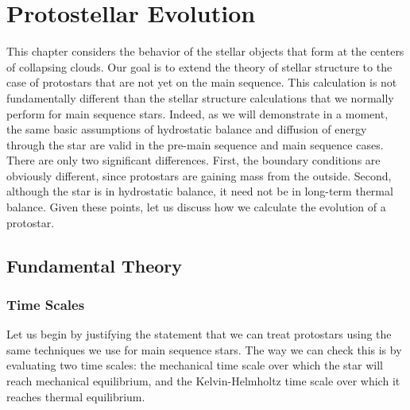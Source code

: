 \chapter{Protostellar Evolution}
\label{ch:protostar_evol}


This chapter considers the behavior of the stellar objects that form at the centers of collapsing clouds. Our goal is to extend the theory of stellar structure to the case of protostars that are not yet on the main sequence. This calculation is not fundamentally different than the stellar structure calculations that we normally perform for main sequence stars. Indeed, as we will demonstrate in a moment, the same basic assumptions of hydrostatic balance and diffusion of energy through the star are valid in the pre-main sequence and main sequence cases. There are only two significant differences. First, the boundary conditions are obviously different, since protostars are gaining mass from the outside. Second, although the star is in hydrostatic balance, it need not be in long-term thermal balance. Given these points, let us discuss how we calculate the evolution of a protostar.

\section{Fundamental Theory}

\subsection{Time Scales}

Let us begin by justifying the statement that we can treat protostars using the same techniques we use for main sequence stars. The way we can check this is by evaluating two time scales: the mechanical time scale over which the star will reach mechanical equilibrium, and the Kelvin-Helmholtz time scale over which it reaches thermal equilibrium.

